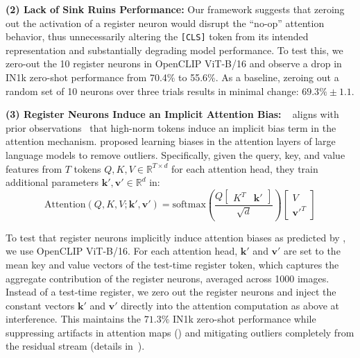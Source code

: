 \documentclass{article}
\begin{document}
\textbf{(2) Lack of Sink Ruins Performance:} Our framework suggests that zeroing out the activation of a register neuron would disrupt the ``no-op'' attention behavior, thus unnecessarily altering the \texttt{[CLS]} token from its intended representation and substantially degrading model performance. To test this, we zero-out the 10 register neurons in OpenCLIP ViT-B/16 and observe a drop in IN1k zero-shot performance from 70.4\% to 55.6\%. As a baseline, zeroing out a random set of 10 neurons over three trials results in minimal change: $69.3\%\pm1.1$. 

\textbf{(3) Register Neurons Induce an Implicit Attention Bias:} ~ aligns with prior observations~\citep{sunmassive,guattention} that high-norm tokens induce an implicit bias term in the attention mechanism. \cite{sunmassive} proposed learning biases in the attention layers of large language models to remove outliers. Specifically, given the query, key, and value features from $T$ tokens $Q, K, V \in \mathbb{R}^{T\times d}$ for each attention head, they train additional parameters $\mathbf{k}', \mathbf{v}' \in \mathbb{R}^{d}$ in: \begin{equation}
\text{Attention}(Q, K, V; \mathbf{k}', \mathbf{v}') = \text{softmax}\left( \frac{Q \begin{bmatrix} K^T & \mathbf{k}' \end{bmatrix}}{\sqrt{d}} \right) \begin{bmatrix} V \\ \mathbf{v}'^T \end{bmatrix}
\label{attention_bias_eq}
\end{equation}


To test that register neurons implicitly induce attention biases as predicted by , 
we use OpenCLIP ViT-B/16. 
For each attention head, $\mathbf{k'}$ and $\mathbf{v'}$ are set to the mean key and value vectors of the test-time register token, which captures the aggregate contribution of the register neurons, averaged across 1000 images. Instead of a test-time register, we zero out the register neurons and inject the constant vectors $\mathbf{k}'$ and $\mathbf{v}'$ directly into the attention computation as above at interference. This maintains the $71.3\%$ IN1k zero-shot performance while suppressing artifacts in attention maps () and mitigating outliers completely from the residual stream (details in~).
\end{document}
